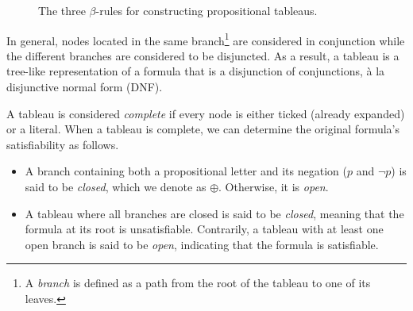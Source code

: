 \begin{figure}[H]
    \caption{The three \(\beta\)-rules for constructing propositional tableaus.}
    \label{fig:Ch03-beta-rules}
\end{figure}

In general, nodes located in the same branch\footnote{A \emph{branch} is defined as a path from the root of the tableau to one of its leaves.} are considered in conjunction while the different branches are considered to be disjuncted. As a result, a tableau is a tree-like representation of a formula that is a disjunction of conjunctions, à la disjunctive normal form (DNF).

A tableau is considered \emph{complete} if every node is either ticked (already expanded) or a literal. When a tableau is complete, we can determine the original formula's satisfiability as follows.
%
\begin{itemize}
    \item A branch containing both a propositional letter and its negation (\(p\) and \(\neg p\)) is said to be \emph{closed}, which we denote as \(\oplus\). Otherwise, it is \emph{open}.
    \item A tableau where all branches are closed is said to be \emph{closed}, meaning that the formula at its root is unsatisfiable. Contrarily, a tableau with at least one open branch is said to be \emph{open}, indicating that the formula is satisfiable.
\end{itemize}



